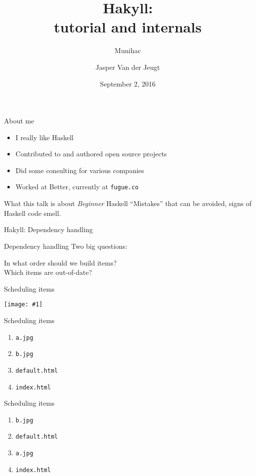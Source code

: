 \documentclass[20pt]{beamer}
\newcommand{\vspaced}{
    \vspace{5mm}
}
\newcommand{\imageframe}[1]{
    {
        \begin{frame}[plain]
        \begin{center}
        \texttt{[image: \#1]}
        \end{center}
        \end{frame}
    }
}
\newcommand{\chapterslide}[1]{
    {
        \begin{frame}[plain]
        \begin{center}
        \large{#1}
        \end{center}
        \end{frame}
    }
}
\newcommand{\code}[1]{
    \texttt{\small{#1}}
}
\begin{document}
\title{Hakyll: \\
tutorial and internals}
\subtitle{Munihac}
\author{Jasper Van der Jeugt}
\date{September 2, 2016}

\begin{frame}[plain]
    \titlepage
\end{frame}

\begin{frame}{About me}
    \begin{itemize}
    \item I really like Haskell
    \item Contributed to and authored open source projects
    \item Did some consulting for various companies
    \item Worked at Better, currently at \code{fugue.co}
    \end{itemize}
\end{frame}

\begin{frame}{What this talk is about}
    \emph{Beginner} Haskell ``Mistakes'' that can be avoided, signs of Haskell
    code smell.
\end{frame}

\chapterslide{Hakyll: Dependency handling}

\begin{frame}{Dependency handling}
    Two big questions: \\
    \vspaced
    In what order should we build items? \\
    Which items are out-of-date? \\
\end{frame}

\chapterslide{Scheduling items}

\imageframe{{images/deps-01.dot}.pdf}

\begin{frame}{Scheduling items}
    \begin{enumerate}
    \item \code{a.jpg}
    \item \code{b.jpg}
    \item \code{default.html}
    \item \code{index.html}
    \end{enumerate}
\end{frame}

\begin{frame}{Scheduling items}
    \begin{enumerate}
    \item \code{b.jpg}
    \item \code{default.html}
    \item \code{a.jpg}
    \item \code{index.html}
    \end{enumerate}
\end{frame}
\end{document}
